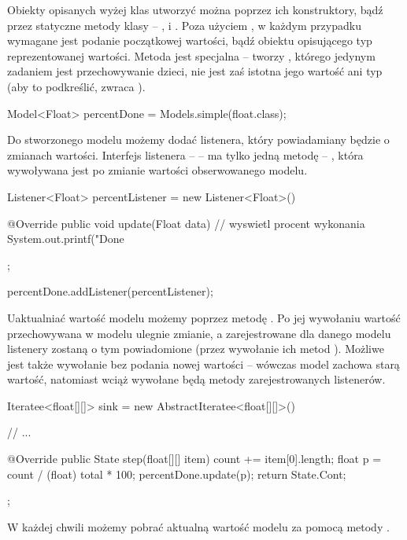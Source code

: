 Obiekty opisanych wyżej klas utworzyć można poprzez ich konstruktory, bądź przez statyczne metody
klasy  -- ,  i . Poza użyciem
, w każdym przypadku wymagane jest podanie początkowej wartości, bądź obiektu
 opisującego typ reprezentowanej wartości. Metoda  jest specjalna --
tworzy , którego jedynym zadaniem jest przechowywanie dzieci, nie jest zaś istotna jego
wartość ani typ (aby to podkreślić,  zwraca ).

\begin{java}
Model<Float> percentDone = Models.simple(float.class);
\end{java}

Do stworzonego modelu możemy dodać listenera, który powiadamiany będzie o zmianach wartości.
Interfejs listenera --  -- ma tylko jedną metodę -- , która wywoływana
jest po zmianie wartości obserwowanego modelu.

\begin{java}
Listener<Float> percentListener = new Listener<Float>() {

    @Override
    public void update(Float data) {
        // wyswietl procent wykonania
        System.out.printf("Done %
    }
};

percentDone.addListener(percentListener);
\end{java}

Uaktualniać wartość modelu możemy poprzez metodę . Po jej wywołaniu wartość
przechowywana w modelu ulegnie zmianie, a zarejestrowane dla danego modelu listenery zostaną o tym
powiadomione (przez wywołanie ich metod ). Możliwe jest także wywołanie 
bez podania nowej wartości -- wówczas model zachowa starą wartość, natomiast wciąż wywołane będą
metody  zarejestrowanych listenerów.

\begin{java}
Iteratee<float[][]> sink = new AbstractIteratee<float[][]>() {

    // ...

    @Override
    public State step(float[][] item) {
        count += item[0].length;
        float p = count / (float) total * 100;
        percentDone.update(p);
        return State.Cont;
    }
};
\end{java}

W każdej chwili możemy pobrać aktualną wartość modelu za pomocą metody .


